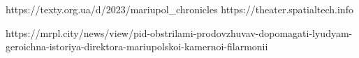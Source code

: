  
 
 
 
 


https://texty.org.ua/d/2023/mariupol_chronicles
https://theater.spatialtech.info

https://mrpl.city/news/view/pid-obstrilami-prodovzhuvav-dopomagati-lyudyam-geroichna-istoriya-direktora-mariupolskoi-kamernoi-filarmonii

